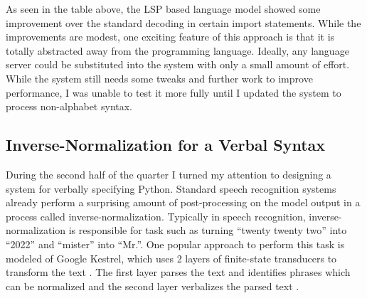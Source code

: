 \documentclass{article}
\begin{document}
\begin{table}[h]
    \centering

\end{table}

As seen in the table above, the LSP based language model showed some improvement over the standard decoding in certain import statements. While the improvements are modest, one exciting feature of this approach is that it is totally abstracted away from the programming language. Ideally, any language server could be substituted into the system with only a small amount of effort. While the system still needs some tweaks and further work to improve performance, I was unable to test it more fully until I updated the system to process non-alphabet syntax.

\subsection{Inverse-Normalization for a Verbal Syntax}

During the second half of the quarter I turned my attention to designing a system for verbally specifying Python. Standard speech recognition systems already perform a surprising amount of post-processing on the model output in a process called inverse-normalization. Typically in speech recognition, inverse-normalization is responsible for task such as turning ``twenty twenty two'' into ``2022'' and ``mister'' into ``Mr.''. One popular approach to perform this task is modeled of Google Kestrel, which uses 2 layers of finite-state transducers to transform the text \cite{kes}. The first layer parses the text and identifies phrases which can be normalized and the second layer verbalizes the parsed text \cite{kes}.
\end{document}

